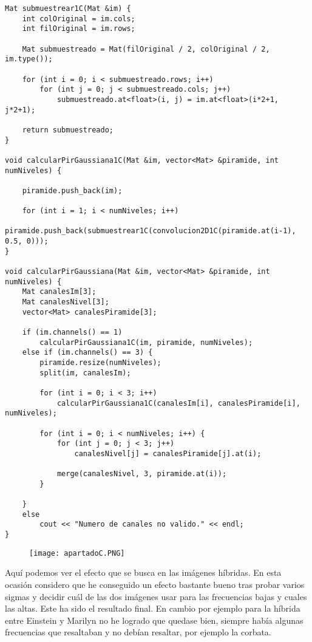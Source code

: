\documentclass[10pt,a4paper]{article}
\begin{document}
\begin{lstlisting}
Mat submuestrear1C(Mat &im) {
	int colOriginal = im.cols;
	int filOriginal = im.rows;

	Mat submuestreado = Mat(filOriginal / 2, colOriginal / 2, im.type());

	for (int i = 0; i < submuestreado.rows; i++)
		for (int j = 0; j < submuestreado.cols; j++)
			submuestreado.at<float>(i, j) = im.at<float>(i*2+1, j*2+1);

	return submuestreado;
}

void calcularPirGaussiana1C(Mat &im, vector<Mat> &piramide, int numNiveles) {

	piramide.push_back(im);

	for (int i = 1; i < numNiveles; i++)
		piramide.push_back(submuestrear1C(convolucion2D1C(piramide.at(i-1), 0.5, 0)));
}

void calcularPirGaussiana(Mat &im, vector<Mat> &piramide, int numNiveles) {
	Mat canalesIm[3];
	Mat canalesNivel[3];
	vector<Mat> canalesPiramide[3];

	if (im.channels() == 1) 
		calcularPirGaussiana1C(im, piramide, numNiveles);	
	else if (im.channels() == 3) {
		piramide.resize(numNiveles);
		split(im, canalesIm);

		for (int i = 0; i < 3; i++)
			calcularPirGaussiana1C(canalesIm[i], canalesPiramide[i], numNiveles);		

		for (int i = 0; i < numNiveles; i++) {
			for (int j = 0; j < 3; j++)
				canalesNivel[j] = canalesPiramide[j].at(i);

			merge(canalesNivel, 3, piramide.at(i));
		}

	}
	else
		cout << "Numero de canales no valido." << endl;
}
\end{lstlisting}

\begin{figure}[H]
\centering
\texttt{[image: apartadoC.PNG]}
\end{figure}

Aquí podemos ver el efecto que se busca en las imágenes híbridas. En esta ocasión considero que he conseguido un efecto bastante bueno tras probar varios sigmas y decidir cuál de las dos imágenes usar para las frecuencias bajas y cuales las altas. Este ha sido el resultado final. En cambio por ejemplo para la híbrida entre Einstein y Marilyn no he logrado que quedase bien, siempre había algunas frecuencias que resaltaban y no debían resaltar, por ejemplo la corbata.\\
\end{document}

